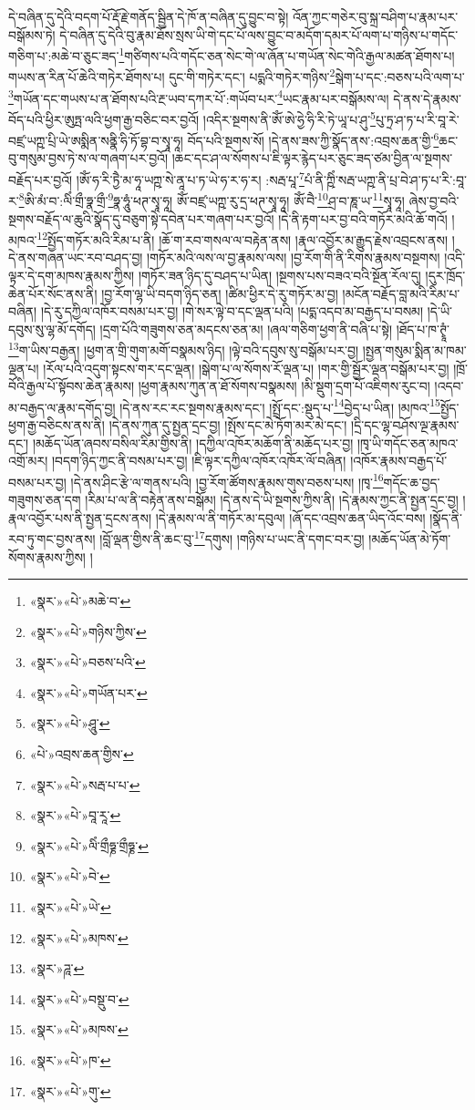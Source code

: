 དེ་བཞིན་དུ་དེའི་བདག་པོ་རྡོ་རྗེ་གནོད་སྦྱིན་དེ་ཁོ་ན་བཞིན་དུ་བྱུང་བ་སྟེ། འོན་ཀྱང་གཅེར་བུ་སྐྲ་བཤིག་པ་རྣམ་པར་བསྒོམས་ཏེ། དེ་བཞིན་དུ་དེའི་བུ་རྣམ་ཐོས་སྲས་ཡི་གེ་དང་པོ་ལས་བྱུང་བ་མདོག་དམར་པོ་ལག་པ་གཉིས་པ་གདོང་གཅིག་པ་:མཆེ་བ་ཅུང་ཟད་\footnote{«སྣར་»«པེ་»མཆེ་བ་}གཙིགས་པའི་གདོང་ཅན་སེང་གེ་ལ་ཞོན་པ་གཡོན་སེང་གེའི་རྒྱལ་མཚན་ཐོགས་པ། གཡས་ན་རིན་པོ་ཆེའི་གཏེར་ཐོགས་པ། དུང་གི་གཏེར་དང་། པདྨའི་གཏེར་གཉིས་\footnote{«སྣར་»«པེ་»གཉིས་ཀྱིས་}སྒེག་པ་དང་:བཅས་པའི་ལག་པ་\footnote{«སྣར་»«པེ་»བཅས་པའི་}གཡོན་དང་གཡས་པ་ན་ཐོགས་པའི་རྔ་ཡབ་དཀར་པོ་:གཡོབ་པར་\footnote{«སྣར་»«པེ་»གཡོན་པར་}ཡང་རྣམ་པར་བསྒོམས་ལ། དེ་ནས་དེ་རྣམས་བོད་པའི་ཕྱིར་ཨུཏྤ་ལའི་ཕྱག་རྒྱ་བཅིང་བར་བྱའོ། །འདིར་སྔགས་ནི་ཨོཾ་ཨེ་ཧྱེ་ཧི་རི་ཏེ་ཡཱ་པ་ཤུ་\footnote{«སྣར་»«པེ་»ཤཱུ་}པུ་ཏྲ་ཤ་ཏ་པ་རི་བཱ་རེ་བཛྲ་ཡཀྵ་པྲི་ཡེ་ཨསྨིན་སནྣི་ཧི་ཏོ་བྷ་བ་སྭཱ་ཧཱ། བོད་པའི་སྔགས་སོ། །དེ་ནས་ཟས་ཀྱི་སྣོད་ནས་:འབྲས་ཆན་གྱི་\footnote{«པེ་»འབྲས་ཆན་གྱིས་}ཆང་བུ་གསུམ་བྱས་ཏེ་ས་ལ་གཞག་པར་བྱའོ། །ཆང་དང་ཤ་ལ་སོགས་པ་ཇི་ལྟར་རྙེད་པར་ཅུང་ཟད་ཙམ་བྱིན་ལ་སྔགས་བརྗོད་པར་བྱའོ། །ཨོཾ་ཧ་རི་ཏྱཻ་མ་ཧཱ་ཡཀྵ་སེ་ནཱ་པ་ཏ་ཡེ་ཧ་ར་ཧ་ར། :སརྦ་པཱ་\footnote{«སྣར་»«པེ་»སརྦ་པ་པ་}པཾ་ནི་ཀྵིཾ་སརྦ་ཡཀྵ་ནི་པྲ་བེ་ཤ་ཏ་པ་རི་:བཱ་ར་\footnote{«སྣར་»«པེ་»བཱ་རཱ་}ཨི་མཾ་བ་:ལིཾ་གྲྀ་ཧྣ་གྲྀ་\footnote{«སྣར་»«པེ་»ལིཾ་གྲྀཧྞ་གྲྀཧྞ་}ཧྣ་ཧཱུཾ་ཕཊ་སྭཱ་ཧཱ། ཨོཾ་བཛྲ་ཡཀྵ་རུ་དྲ་ཕཊ་སྭཱ་ཧཱ། ཨོཾ་བཻ་\footnote{«སྣར་»«པེ་»བེ་}ཤྲ་བ་ཎཱ་ཡ་\footnote{«སྣར་»«པེ་»ཡེ་}སྭཱ་ཧཱ། ཞེས་བྱ་བའི་སྔགས་བརྗོད་ལ་ཆུའི་སྣོད་དུ་བཅུག་སྟེ་དབེན་པར་གཞག་པར་བྱའོ། །དེ་ནི་རྟག་པར་བྱ་བའི་གཏོར་མའི་ཆོ་གའོ། །མཁའ་\footnote{«སྣར་»«པེ་»མཁས་}སྤྱོད་གཏོར་མའི་རིམ་པ་ནི། །ཆོ་ག་རབ་གསལ་ལ་བརྟེན་ནས། །རྣལ་འབྱོར་མ་རྒྱུད་རྗེས་འབྲངས་ནས། །
དེ་ནས་གཞན་ཡང་རབ་བཤད་བྱ། །གཏོར་མའི་ལས་ལ་བྱ་རྣམས་ལས། །བྱ་རོག་གི་ནི་རིགས་རྣམས་བསྔགས། །འདི་ལྟར་དེ་དག་མཁས་རྣམས་ཀྱིས། །གཏོར་ཟན་ཉིད་དུ་བཤད་པ་ཡིན། །སྔགས་པས་བཟའ་བའི་སྔོན་རོལ་དུ། །དུར་ཁྲོད་ཆེན་པོར་སོང་ནས་ནི། །བྱ་རོག་ལྷ་ཡི་བདག་ཉིད་ཅན། །ཚིམ་ཕྱིར་དེ་རུ་གཏོར་མ་བྱ། །མངོན་བརྗོད་བླ་མའི་རིམ་པ་བཞིན། །དེ་རུ་དཀྱིལ་འཁོར་བསམ་པར་བྱ། །གེ་སར་ལྟེ་བ་དང་ལྡན་པའི། །པདྨ་འདབ་མ་བརྒྱད་པ་བསམ། །དེ་ཡི་དབུས་སུ་ལྷ་མོ་དགོད། །དྲག་པོའི་གཟུགས་ཅན་མདངས་ཅན་མ། །ཞལ་གཅིག་ཕྱག་ནི་བཞི་པ་སྟེ། །ཐོད་པ་ཁ་ཊྭཱཾ་\footnote{«སྣར་»ཌཱ་}ག་ཡིས་བརྒྱན། །ཕྱག་ན་གྲི་གུག་མགོ་བསྣམས་ཉིད། །ལྟེ་བའི་དབུས་སུ་བསྒོམ་པར་བྱ། །སྤྱན་གསུམ་སྨིན་མ་ཁམ་ལྡན་པ། །རོལ་པའི་འདུག་སྟངས་གར་དང་ལྡན། །སྒེག་པ་ལ་སོགས་རོ་ལྡན་པ། །གར་གྱི་སྦྱོར་ལྡན་བསྒོམ་པར་བྱ། །ཁྲོ་བོའི་རྒྱལ་པོ་སྟོབས་ཆེན་རྣམས། །ཕྱག་རྣམས་ཀུན་ན་ཐོ་སོགས་བསྣམས། །མི་སྡུག་དྲག་པོ་འཇིགས་རུང་བ། །འདབ་མ་བརྒྱད་ལ་རྣམ་དགོད་བྱ། །དེ་ནས་རང་རང་སྔགས་རྣམས་དང་། །སྤྲོ་དང་:སྡུད་པ་\footnote{«སྣར་»«པེ་»བསྡུ་བ་}བྱེད་པ་ཡིན། །མཁའ་\footnote{«སྣར་»«པེ་»མཁས་}སྤྱོད་ཕྱག་རྒྱ་བཅིངས་ནས་ནི། །དེ་ནས་ཀུན་དུ་སྤྱན་དྲང་བྱ། །སྤོས་དང་མེ་ཏོག་མར་མེ་དང་། །དྲི་དང་ལྷ་བཤོས་ལྔ་རྣམས་དང་། །མཆོད་ཡོན་ཞབས་བསིལ་རིམ་གྱིས་ནི། །དཀྱིལ་འཁོར་མཆོག་ནི་མཆོད་པར་བྱ། །ཁྭ་ཡི་གདོང་ཅན་མཁའ་འགྲོ་མར། །བདག་ཉིད་ཀྱང་ནི་བསམ་པར་བྱ། །ཇི་ལྟར་དཀྱིལ་འཁོར་འཁོར་ལོ་བཞིན། །འཁོར་རྣམས་བརྒྱད་པོ་བསམ་པར་བྱ། །དེ་ནས་ཤིང་རྩེ་ལ་གནས་པའི། །བྱ་རོག་ཚོགས་རྣམས་གུས་བཅས་པས། །ཁྭ་\footnote{«སྣར་»«པེ་»ཁ་}གདོང་ཆ་བྱད་གཟུགས་ཅན་དག །རིམ་པ་ལ་ནི་བརྟེན་ནས་བསྒོམ། །དེ་ནས་དེ་ཡི་སྔགས་ཀྱིས་ནི། །དེ་རྣམས་ཀྱང་ནི་སྤྱན་དྲང་བྱ། །རྣལ་འབྱོར་པས་ནི་སྤྱན་དྲངས་ནས། །དེ་རྣམས་ལ་ནི་གཏོར་མ་དབུལ། །ཞོ་དང་འབྲས་ཆན་ཡིད་འོང་བས། །སྣོད་ནི་རབ་ཏུ་གང་བྱས་ནས། །བློ་ལྡན་གྱིས་ནི་ཆང་བུ་\footnote{«སྣར་»«པེ་»གུ་}དགུས། །གཉིས་པ་ཡང་ནི་དགང་བར་བྱ། །མཆོད་ཡོན་མེ་ཏོག་སོགས་རྣམས་ཀྱིས། །
